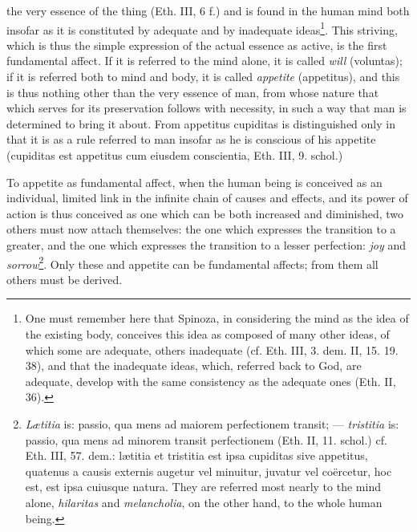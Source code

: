 \documentclass[12pt,a4paper,openany]{book}
\newcommand{\opage}[1]{\marginnote{\footnotesize\textit{[#1]}}}
\begin{document}
the very essence of the thing (Eth.
\opage{113}\setcounter{footnote}{0}III, 6 f.) and is found in the human mind both insofar
as it is constituted by adequate and by inadequate
ideas\footnote{One must remember here that Spinoza, in
considering the mind as the idea of the existing body,
conceives this idea as composed of many other ideas, of
which some are adequate, others inadequate
(cf. Eth. III, 3. dem. II, 15. 19. 38), and that the inadequate ideas,
which, referred back to God, are adequate, develop with
the same consistency as the adequate ones (Eth. II, 36).}.
This striving, which is thus the simple expression of
the actual essence as active, is the first fundamental affect.
If it is referred to the mind alone, it is called
\emph{will} (voluntas); if it is referred both to mind and
body, it is called \emph{appetite} (appetitus), and this is
thus nothing other than the very essence of man, from whose nature
that which serves for its preservation follows with necessity,
in such a way that man is determined to bring it about. From
appetitus cupiditas is distinguished only in that it is as a rule
referred to man insofar as he is conscious of his appetite
(cupiditas est appetitus cum eiusdem conscientia,
Eth. III, 9. schol.)

To appetite as fundamental affect, when the
human being is conceived as an individual, limited link
in the infinite chain of causes and effects, and its
power of action is thus conceived as one which can be both increased
and diminished, two others must now attach themselves: the one which expresses
the transition to a greater, and the one which expresses the transition
to a lesser perfection: \emph{joy} and \emph{sorrow}\footnote{\emph{Lætitia}
is: passio, qua mens ad maiorem perfectionem transit;
--- \emph{tristitia} is: passio, qua mens ad minorem transit
perfectionem (Eth. II, 11. schol.) cf. Eth. III, 57. dem.:
lætitia et tristitia est ipsa cupiditas sive appetitus, quatenus
a causis externis augetur vel minuitur, juvatur vel coërcetur,
hoc est, est ipsa cuiusque natura. They are referred most nearly to
the mind alone, \emph{hilaritas} and \emph{melancholia}, on the other hand, to the whole
human being.}. Only
these and appetite can be fundamental affects; from them
all others must be derived.
\end{document}
